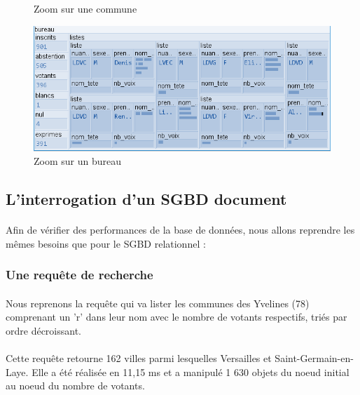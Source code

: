 \begin{figure}[!htb]
\begin{minipage}{0.48\textwidth}
     \caption{Zoom sur une commune}\label{Fig:doc_commune}
   \end{minipage}\hfill
   \begin{minipage}{0.48\textwidth}
     \centering
     \includegraphics[width=.9\linewidth]{./src_img/modelisation_doc_4.png}
     \caption{Zoom sur un bureau}\label{Fig:doc_bureau}
   \end{minipage}
\end{figure}
\fi

\subsection{L'interrogation d'un SGBD document}


\paragraph{}Afin de vérifier des performances de la base de données, nous allons reprendre les mêmes besoins que pour le SGBD relationnel :

\subsubsection{Une requête de recherche}
\paragraph{}Nous reprenons la requête qui va lister les communes des Yvelines (78) comprenant un 'r' dans leur nom avec le nombre de votants respectifs, triés par ordre décroissant.
\paragraph{}Cette requête retourne 162 villes parmi lesquelles Versailles et Saint-Germain-en-Laye. Elle a été réalisée en 11,15 ms et a manipulé 1 630 objets du noeud initial au noeud du nombre de votants.


